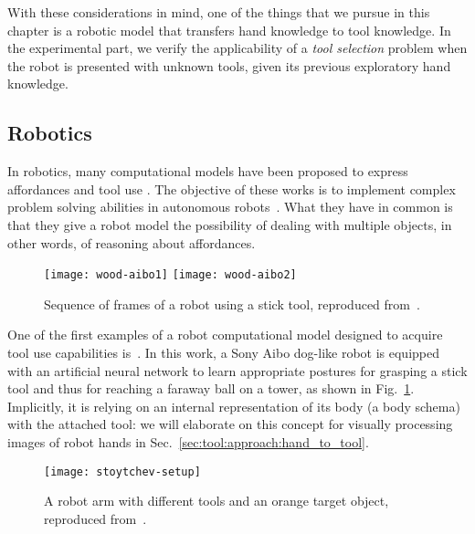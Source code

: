 With these considerations in mind, one of the things that we pursue in this chapter is a robotic model that transfers hand knowledge to tool knowledge.
In the experimental part, we verify the applicability of a \emph{tool selection} problem when the robot is presented with unknown tools, given its previous exploratory hand knowledge.

\subsection{Robotics}

In robotics, many computational models have been proposed to express affordances and tool use \cite{wood:2005:sieds,stoytchev:2005:icra,sinapov:2007:icdl,stoytchev:2008:lnai,tikhanoff:2013:humanoids,mar:2018:tcds,jain:2013:alr,abelha:2017:iros,moldovan:2018:ar}.
The objective of these works is to implement complex problem solving abilities in autonomous robots~\cite{jamone:2016:tcds}.
What they have in common is that they give a robot model the possibility of dealing with multiple objects, in other words, of reasoning about \intobj{} affordances.

\begin{figure}
\centering
\subfloat
{ \texttt{[image: wood-aibo1]} } \quad
%
\subfloat
{ \texttt{[image: wood-aibo2]} }
\caption{Sequence of frames of a robot using a stick tool, reproduced from~\cite{wood:2005:sieds}.}
\label{fig:tool:wood-aibo}
\end{figure}

One of the first examples of a robot computational model designed to acquire tool use capabilities is~\cite{wood:2005:sieds}.
In this work, a Sony Aibo dog-like robot is equipped with an artificial neural network to learn appropriate postures for grasping a stick tool and thus for reaching a faraway ball on a tower, as shown in Fig.~\ref{fig:tool:wood-aibo}.
Implicitly, it is relying on an internal representation of its body (a body schema) with the attached tool: we will elaborate on this concept for visually processing images of robot hands in Sec.~\ref{sec:tool:approach:hand_to_tool}.

\begin{figure}
\centering
\texttt{[image: stoytchev-setup]}
\caption{A robot arm with different tools and an orange target object, reproduced from~\cite{stoytchev:2008:lnai}.}
\label{fig:tool:stoytchev-setup}
\end{figure}

